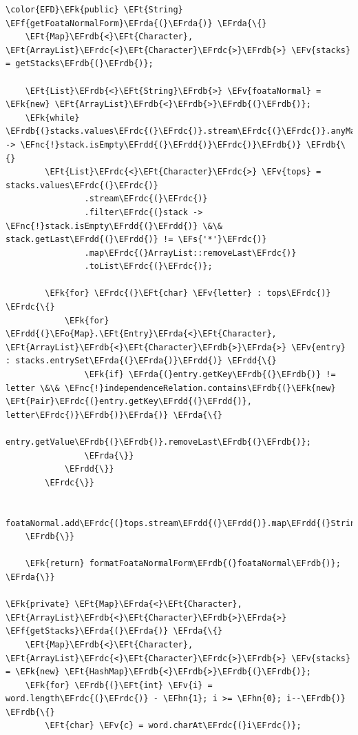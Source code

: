 \documentclass[11pt]{article}
\newcommand{\EFs}[1]{\textcolor{EFs}{#1}} %
\newcommand{\EFk}[1]{\textcolor{EFk}{#1}} %
\newcommand{\EFf}[1]{\textcolor{EFf}{#1}} %
\newcommand{\EFv}[1]{\textcolor{EFv}{#1}} %
\newcommand{\EFt}[1]{\textcolor{EFt}{#1}} %
\newcommand{\EFo}[1]{\textcolor{EFo}{#1}} %
\newcommand{\EFnc}[1]{\textcolor{EFnc}{\textbf{#1}}} %
\newcommand{\EFhn}[1]{\textcolor{EFhn}{#1}} %
\newcommand{\EFrda}[1]{#1} %
\newcommand{\EFrdb}[1]{\textcolor{EFrdb}{#1}} %
\newcommand{\EFrdc}[1]{\textcolor{EFrdc}{#1}} %
\newcommand{\EFrdd}[1]{\textcolor{EFrdd}{#1}} %
\begin{document}
\begin{Code}
\begin{Verbatim}
\color{EFD}\EFk{public} \EFt{String} \EFf{getFoataNormalForm}\EFrda{(}\EFrda{)} \EFrda{\{}
    \EFt{Map}\EFrdb{<}\EFt{Character}, \EFt{ArrayList}\EFrdc{<}\EFt{Character}\EFrdc{>}\EFrdb{>} \EFv{stacks} = getStacks\EFrdb{(}\EFrdb{)};

    \EFt{List}\EFrdb{<}\EFt{String}\EFrdb{>} \EFv{foataNormal} = \EFk{new} \EFt{ArrayList}\EFrdb{<}\EFrdb{>}\EFrdb{(}\EFrdb{)};
    \EFk{while} \EFrdb{(}stacks.values\EFrdc{(}\EFrdc{)}.stream\EFrdc{(}\EFrdc{)}.anyMatch\EFrdc{(}stack -> \EFnc{!}stack.isEmpty\EFrdd{(}\EFrdd{)}\EFrdc{)}\EFrdb{)} \EFrdb{\{}
        \EFt{List}\EFrdc{<}\EFt{Character}\EFrdc{>} \EFv{tops} = stacks.values\EFrdc{(}\EFrdc{)}
                .stream\EFrdc{(}\EFrdc{)}
                .filter\EFrdc{(}stack -> \EFnc{!}stack.isEmpty\EFrdd{(}\EFrdd{)} \&\& stack.getLast\EFrdd{(}\EFrdd{)} != \EFs{'*'}\EFrdc{)}
                .map\EFrdc{(}ArrayList::removeLast\EFrdc{)}
                .toList\EFrdc{(}\EFrdc{)};

        \EFk{for} \EFrdc{(}\EFt{char} \EFv{letter} : tops\EFrdc{)} \EFrdc{\{}
            \EFk{for} \EFrdd{(}\EFo{Map}.\EFt{Entry}\EFrda{<}\EFt{Character}, \EFt{ArrayList}\EFrdb{<}\EFt{Character}\EFrdb{>}\EFrda{>} \EFv{entry} : stacks.entrySet\EFrda{(}\EFrda{)}\EFrdd{)} \EFrdd{\{}
                \EFk{if} \EFrda{(}entry.getKey\EFrdb{(}\EFrdb{)} != letter \&\& \EFnc{!}independenceRelation.contains\EFrdb{(}\EFk{new} \EFt{Pair}\EFrdc{(}entry.getKey\EFrdd{(}\EFrdd{)}, letter\EFrdc{)}\EFrdb{)}\EFrda{)} \EFrda{\{}
                    entry.getValue\EFrdb{(}\EFrdb{)}.removeLast\EFrdb{(}\EFrdb{)};
                \EFrda{\}}
            \EFrdd{\}}
        \EFrdc{\}}

        foataNormal.add\EFrdc{(}tops.stream\EFrdd{(}\EFrdd{)}.map\EFrdd{(}String::valueOf\EFrdd{)}.collect\EFrdd{(}Collectors.joining\EFrda{(}\EFrda{)}\EFrdd{)}\EFrdc{)};
    \EFrdb{\}}

    \EFk{return} formatFoataNormalForm\EFrdb{(}foataNormal\EFrdb{)};
\EFrda{\}}

\EFk{private} \EFt{Map}\EFrda{<}\EFt{Character}, \EFt{ArrayList}\EFrdb{<}\EFt{Character}\EFrdb{>}\EFrda{>} \EFf{getStacks}\EFrda{(}\EFrda{)} \EFrda{\{}
    \EFt{Map}\EFrdb{<}\EFt{Character}, \EFt{ArrayList}\EFrdc{<}\EFt{Character}\EFrdc{>}\EFrdb{>} \EFv{stacks} = \EFk{new} \EFt{HashMap}\EFrdb{<}\EFrdb{>}\EFrdb{(}\EFrdb{)};
    \EFk{for} \EFrdb{(}\EFt{int} \EFv{i} = word.length\EFrdc{(}\EFrdc{)} - \EFhn{1}; i >= \EFhn{0}; i--\EFrdb{)} \EFrdb{\{}
        \EFt{char} \EFv{c} = word.charAt\EFrdc{(}i\EFrdc{)};


\end{Verbatim}
\end{Code}
\end{document}
